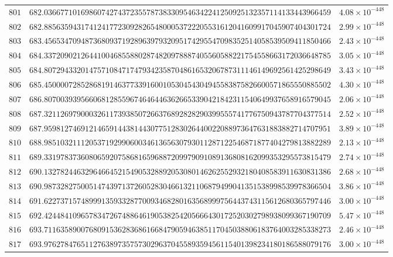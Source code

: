\documentclass[12pt,reqno]{amsart}
\theoremstyle{remark}
\begin{document}
\begin{longtable}{clc}
$801$ & $682.0366771016986074274372355787383309546342241250925132357114133443966459$ & $4.08\times 10^{-448}$ \\
$802$ & $682.8856359431741241772309282654800053722205531612041609917045907404301724$ & $2.99\times 10^{-448}$ \\
$803$ & $683.4565347094873680937192896397932095174295547098352514058539509411850466$ & $2.43\times 10^{-448}$ \\
$804$ & $684.3372090212644100468558802874820978887405560588221754558663172036648785$ & $3.05\times 10^{-448}$ \\
$805$ & $684.8072943320147571084717479342358704861653206787311146149692561425298649$ & $3.43\times 10^{-448}$ \\
$806$ & $685.4500007285286819146377339160010530454304945583875826600571865550885502$ & $4.30\times 10^{-448}$ \\
$807$ & $686.8070039395660681285596746464463626653390421842311540649937658916579045$ & $2.06\times 10^{-448}$ \\
$808$ & $687.3211269790003261173938507266376892828290399555741776750943787704377514$ & $2.52\times 10^{-448}$ \\
$809$ & $687.9598127469121465914438144307751283026440022088973647631883882714707951$ & $3.89\times 10^{-448}$ \\
$810$ & $688.9851032111205371929906003461365630793011287122546871877404279813882289$ & $2.13\times 10^{-448}$ \\
$811$ & $689.3319783736080659207586816596887209979091089136808162099353295573815479$ & $2.74\times 10^{-448}$ \\
$812$ & $690.1327824463296466452154905328892053080146262552932180408583911630831386$ & $2.68\times 10^{-448}$ \\
$813$ & $690.9873282750051474397137260528304661321106879499041351538998539978366504$ & $3.86\times 10^{-448}$ \\
$814$ & $691.6227371574899913593328770093468280163568999756443743115612680365797446$ & $3.00\times 10^{-448}$ \\
$815$ & $692.4244841096578347267488646190538254205666430172520302798938099367190709$ & $5.47\times 10^{-448}$ \\
$816$ & $693.7116358900768091536283686166847905946385117045038806183764003285338273$ & $2.46\times 10^{-448}$ \\
$817$ & $693.9762784765112763897357573029637045589359456115401398234180186588079176$ & $3.00\times 10^{-448}$ \\

\end{longtable}
\end{document}
